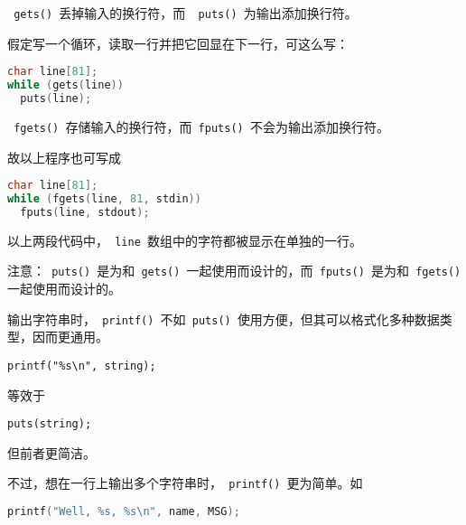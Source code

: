 \begin{frame}[fragile]
\lstinline| gets() |丢掉输入的换行符，而\lstinline|  puts() |为输出添加换行符。\vspace{0.1in}

假定写一个循环，读取一行并把它回显在下一行，可这么写：
\begin{lstlisting}[language=c]
char line[81];
while (gets(line))
  puts(line);
\end{lstlisting} 
\end{frame}

\begin{frame}[fragile]
\lstinline| fgets() |存储输入的换行符，而\lstinline| fputs() |不会为输出添加换行符。\vspace{0.1in}

故以上程序也可写成
\begin{lstlisting}[language=c]
char line[81];
while (fgets(line, 81, stdin))
  fputs(line, stdout);
\end{lstlisting} \vspace{0.1in}

以上两段代码中，\lstinline| line |数组中的字符都被显示在单独的一行。
\end{frame}

\begin{frame}[fragile]
注意：\lstinline| puts() |是为和\lstinline| gets() |一起使用而设计的，而\lstinline| fputs() |是为和\lstinline| fgets() |一起使用而设计的。
\end{frame}

\begin{frame}[fragile] 
输出字符串时，\lstinline| printf() |不如\lstinline| puts() |使用方便，但其可以格式化多种数据类型，因而更通用。

\begin{lstlisting}[basicstyle=\ttfamily]
printf("%s\n", string);
\end{lstlisting}
等效于
\begin{lstlisting}[basicstyle=\ttfamily]
puts(string);
\end{lstlisting}
但前者更简洁。
\end{frame}

\begin{frame}[fragile] 
不过，想在一行上输出多个字符串时，\lstinline| printf() |更为简单。如
\begin{lstlisting}[language=c]
printf("Well, %s, %s\n", name, MSG);
\end{lstlisting}
\end{frame}

